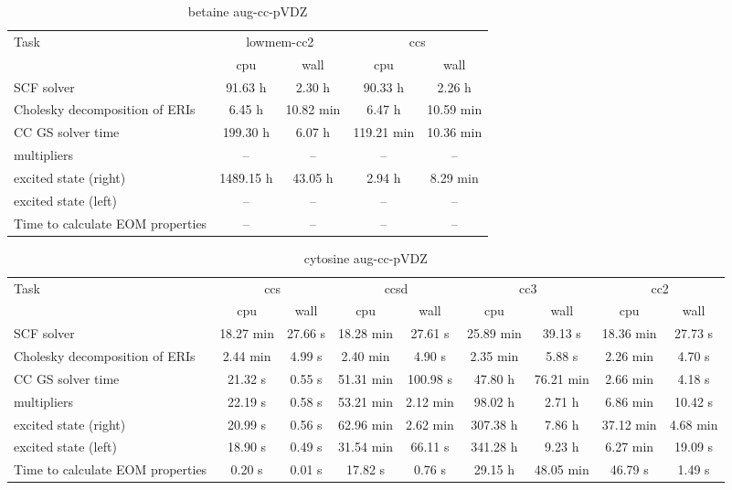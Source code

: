 \documentclass{article}
\begin{document}
\begin{table}
\caption{betaine aug-cc-pVDZ}
\begin{tabular}{lcccc}
\toprule
Task & \multicolumn{2}{c}{lowmem-cc2} & \multicolumn{2}{c}{ccs}\\
\cmidrule(lr){2-3}\cmidrule(lr){4-5}
 & cpu & wall & cpu & wall\\
\midrule
SCF solver & 91.63 h & 2.30 h & 90.33 h & 2.26 h\\
Cholesky decomposition of ERIs & 6.45 h & 10.82 min & 6.47 h & 10.59 min\\
CC GS solver time & 199.30 h & 6.07 h & 119.21 min & 10.36 min\\
multipliers & -- & -- & -- & --\\
excited state (right) & 1489.15 h & 43.05 h & 2.94 h & 8.29 min\\
excited state (left) & -- & -- & -- & --\\
Time to calculate EOM properties & -- & -- & -- & --\\
\bottomrule
\end{tabular}
\end{table}
\begin{table}
\caption{cytosine aug-cc-pVDZ}
\begin{tabular}{lcccccccc}
\toprule
Task & \multicolumn{2}{c}{ccs} & \multicolumn{2}{c}{ccsd} & \multicolumn{2}{c}{cc3} & \multicolumn{2}{c}{cc2}\\
\cmidrule(lr){2-3}\cmidrule(lr){4-5}\cmidrule(lr){6-7}\cmidrule(lr){8-9}
 & cpu & wall & cpu & wall & cpu & wall & cpu & wall\\
\midrule
SCF solver & 18.27 min & 27.66 s & 18.28 min & 27.61 s & 25.89 min & 39.13 s & 18.36 min & 27.73 s\\
Cholesky decomposition of ERIs & 2.44 min & 4.99 s & 2.40 min & 4.90 s & 2.35 min & 5.88 s & 2.26 min & 4.70 s\\
CC GS solver time & 21.32 s & 0.55 s & 51.31 min & 100.98 s & 47.80 h & 76.21 min & 2.66 min & 4.18 s\\
multipliers & 22.19 s & 0.58 s & 53.21 min & 2.12 min & 98.02 h & 2.71 h & 6.86 min & 10.42 s\\
excited state (right) & 20.99 s & 0.56 s & 62.96 min & 2.62 min & 307.38 h & 7.86 h & 37.12 min & 4.68 min\\
excited state (left) & 18.90 s & 0.49 s & 31.54 min & 66.11 s & 341.28 h & 9.23 h & 6.27 min & 19.09 s\\
Time to calculate EOM properties & 0.20 s & 0.01 s & 17.82 s & 0.76 s & 29.15 h & 48.05 min & 46.79 s & 1.49 s\\
\bottomrule
\end{tabular}
\end{table}
\end{document}
